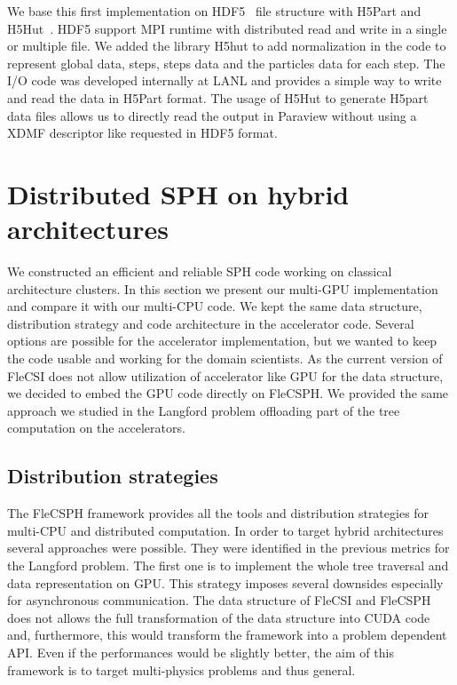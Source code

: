 We base this first implementation on HDF5~\cite{folk1999hdf5} file structure with H5Part and H5Hut~\cite{howison2010h5hut}. 
HDF5 support MPI runtime with distributed read and write in a single or multiple file. 
We added the library H5hut to add normalization in the code to represent global data, steps, steps data and the particles data for each step.
The I/O code was developed internally at LANL and provides a simple way to write and read the data in H5Part format. 
The usage of H5Hut to generate H5part data files allows us to directly read the output in Paraview without using a XDMF descriptor like requested in HDF5 format.

\section{Distributed SPH on hybrid architectures}
We constructed an efficient and reliable SPH code working on classical architecture clusters. 
In this section we present our multi-GPU implementation and compare it with our multi-CPU code. 
We kept the same data structure, distribution strategy and code architecture in the accelerator code. 
Several options are possible for the accelerator implementation, but we wanted to keep the code usable and working for the domain scientists. 
As the current version of FleCSI does not allow utilization of accelerator like GPU for the data structure, we decided to embed the GPU code directly on FleCSPH. 
We provided the same approach we studied in the Langford problem offloading part of the tree computation on the accelerators. 

\subsection{Distribution strategies} 
The FleCSPH framework provides all the tools and distribution strategies for multi-CPU and distributed computation.
In order to target hybrid architectures several approaches were possible.
They were identified in the previous metrics for the Langford problem.
The first one is to implement the whole tree traversal and data representation on GPU. 
This strategy imposes several downsides especially for asynchronous communication.
The data structure of FleCSI and FleCSPH does not allows the full transformation of the data structure into CUDA code and, furthermore, this would transform the framework into a problem dependent API. 
Even if the performances would be slightly better, the aim of this framework is to target multi-physics problems and thus general.

